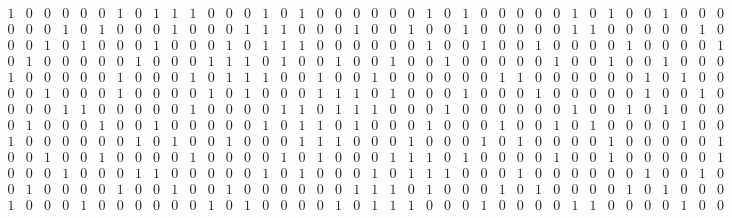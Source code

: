 \documentclass[a4paper,10pt]{article}
\begin{document}
\begin{scriptsize}
\[\begin{array}{rrrrrrrrrrrrrrrrrrrrrrrrrrrrrrrrrrrrrrrr}
1 & 0 & 0 & 0 & 0 & 0 & 1 & 0 & 1 & 1 & 1 & 0 & 0 & 0 & 1 & 0 & 1 & 0 & 0 & 0 & 0 & 0 & 0 & 1 & 0 & 1 & 0 & 0 & 0 & 0 & 0 & 1 & 0 & 1 & 0 & 0 & 1 & 0 & 0 & 0 \\
0 & 0 & 0 & 1 & 0 & 1 & 0 & 0 & 0 & 1 & 0 & 0 & 0 & 1 & 1 & 1 & 0 & 0 & 0 & 1 & 0 & 0 & 1 & 0 & 0 & 1 & 0 & 0 & 0 & 0 & 0 & 1 & 1 & 0 & 0 & 0 & 0 & 0 & 1 & 0 \\
0 & 0 & 1 & 0 & 1 & 0 & 0 & 0 & 1 & 0 & 0 & 0 & 1 & 0 & 1 & 1 & 1 & 0 & 0 & 0 & 0 & 0 & 0 & 1 & 0 & 0 & 1 & 0 & 0 & 1 & 0 & 0 & 0 & 0 & 1 & 0 & 0 & 0 & 0 & 1 \\
0 & 1 & 0 & 0 & 0 & 0 & 0 & 1 & 0 & 0 & 0 & 1 & 1 & 1 & 0 & 1 & 0 & 0 & 1 & 0 & 0 & 1 & 0 & 0 & 1 & 0 & 0 & 0 & 0 & 0 & 1 & 0 & 0 & 1 & 0 & 0 & 1 & 0 & 0 & 0 \\
1 & 0 & 0 & 0 & 0 & 0 & 1 & 0 & 0 & 0 & 1 & 0 & 1 & 1 & 1 & 0 & 0 & 1 & 0 & 0 & 1 & 0 & 0 & 0 & 0 & 0 & 0 & 1 & 1 & 0 & 0 & 0 & 0 & 0 & 0 & 1 & 0 & 1 & 0 & 0 \\
0 & 0 & 1 & 0 & 0 & 0 & 1 & 0 & 0 & 0 & 0 & 1 & 0 & 1 & 0 & 0 & 0 & 1 & 1 & 1 & 0 & 1 & 0 & 0 & 0 & 1 & 0 & 0 & 0 & 1 & 0 & 0 & 0 & 0 & 0 & 1 & 0 & 0 & 1 & 0 \\
0 & 0 & 0 & 1 & 1 & 0 & 0 & 0 & 0 & 0 & 1 & 0 & 0 & 0 & 0 & 1 & 1 & 0 & 1 & 1 & 1 & 0 & 0 & 0 & 1 & 0 & 0 & 0 & 0 & 0 & 0 & 1 & 0 & 0 & 1 & 0 & 1 & 0 & 0 & 0 \\
0 & 1 & 0 & 0 & 0 & 1 & 0 & 0 & 1 & 0 & 0 & 0 & 0 & 0 & 1 & 0 & 1 & 1 & 0 & 1 & 0 & 0 & 0 & 1 & 0 & 0 & 0 & 1 & 0 & 0 & 1 & 0 & 1 & 0 & 0 & 0 & 0 & 1 & 0 & 0 \\
1 & 0 & 0 & 0 & 0 & 0 & 0 & 1 & 0 & 1 & 0 & 0 & 1 & 0 & 0 & 0 & 1 & 1 & 1 & 0 & 0 & 0 & 1 & 0 & 0 & 0 & 1 & 0 & 1 & 0 & 0 & 0 & 0 & 1 & 0 & 0 & 0 & 0 & 0 & 1 \\
0 & 0 & 1 & 0 & 0 & 1 & 0 & 0 & 0 & 0 & 1 & 0 & 0 & 0 & 0 & 1 & 0 & 1 & 0 & 0 & 0 & 1 & 1 & 1 & 0 & 1 & 0 & 0 & 0 & 0 & 1 & 0 & 0 & 1 & 0 & 0 & 0 & 0 & 0 & 1 \\
0 & 0 & 0 & 1 & 0 & 0 & 0 & 1 & 1 & 0 & 0 & 0 & 0 & 0 & 1 & 0 & 1 & 0 & 0 & 0 & 1 & 0 & 1 & 1 & 1 & 0 & 0 & 0 & 1 & 0 & 0 & 0 & 0 & 0 & 0 & 1 & 0 & 0 & 1 & 0 \\
0 & 1 & 0 & 0 & 0 & 0 & 1 & 0 & 0 & 1 & 0 & 0 & 1 & 0 & 0 & 0 & 0 & 0 & 0 & 1 & 1 & 1 & 0 & 1 & 0 & 0 & 0 & 1 & 0 & 1 & 0 & 0 & 0 & 0 & 1 & 0 & 1 & 0 & 0 & 0 \\
1 & 0 & 0 & 0 & 1 & 0 & 0 & 0 & 0 & 0 & 0 & 1 & 0 & 1 & 0 & 0 & 0 & 0 & 1 & 0 & 1 & 1 & 1 & 0 & 0 & 0 & 1 & 0 & 0 & 0 & 0 & 1 & 1 & 0 & 0 & 0 & 0 & 1 & 0 & 0 \\

\end{array}\]
\end{scriptsize}
\end{document}
